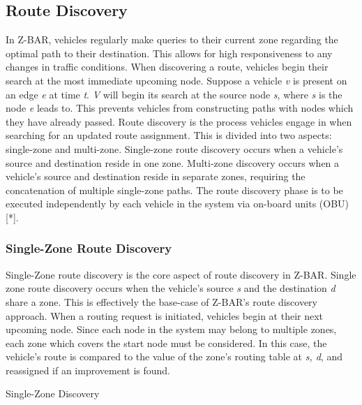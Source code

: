 \documentclass[conference]{IEEEtran}
\begin{document}
\subsection{Route Discovery}

In Z-BAR, vehicles regularly make queries to their current zone regarding the optimal path to their destination. This allows for high responsiveness to any changes in traffic conditions. When discovering a route, vehicles begin their search at the most immediate upcoming node. Suppose a vehicle \textit{v} is present on an edge \textit{e} at time \textit{t}. \textit{V} will begin its search at the source node \textit{s}, where \textit{s} is the node \textit{e} leads to. This prevents vehicles from constructing paths with nodes which they have already passed. Route discovery is the process vehicles engage in when searching for an updated route assignment. This is divided into two aspects: single-zone and multi-zone. Single-zone route discovery occurs when a vehicle's source and destination reside in one zone. Multi-zone discovery occurs when a vehicle's source and destination reside in separate zones, requiring the concatenation of multiple single-zone paths. The route discovery phase is to be executed independently by each vehicle in the system via on-board units (OBU) [*].

\subsubsection{Single-Zone Route Discovery}

Single-Zone route discovery is the core aspect of route discovery in Z-BAR. Single zone route discovery occurs when the vehicle's source \textit{s} and the destination \textit{d} share a zone. This is effectively the base-case of Z-BAR's route discovery approach. When a routing request is initiated, vehicles begin at their next upcoming node. Since each node in the system may belong to multiple zones, each zone which covers the start node must be considered. In this case, the vehicle's route is compared to the value of the zone's routing table at \textit{s, d}, and reassigned if an improvement is found.

\begin{algorithm}[H]
  \caption{Single-Zone Discovery}
  \label{route_discovery_single_zone}
  \begin{algorithmic}[1]
  \EndProcedure
  \end{algorithmic}
\end{algorithm}
\end{document}
